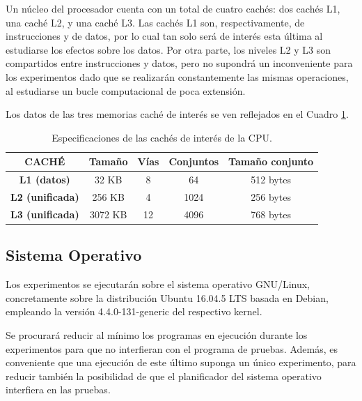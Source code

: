 \documentclass[conference]{IEEEtran}
\begin{document}
Un núcleo del procesador cuenta con un total de cuatro cachés: dos cachés L1, una caché L2, y una caché L3. Las cachés L1 son, respectivamente, de instrucciones y de datos, por lo cual tan solo será de interés esta última al estudiarse los efectos sobre los datos. Por otra parte, los niveles L2 y L3 son compartidos entre instrucciones y datos, pero no supondrá un inconveniente para los experimentos dado que se realizarán constantemente las mismas operaciones, al estudiarse un bucle computacional de poca extensión.

Los datos de las tres memorias caché de interés se ven reflejados en el Cuadro \ref{especificacionesCaches}.

\begin{table}[htbp]
\caption{Especificaciones de las cachés de interés de la CPU.}
\begin{center}
\begin{tabular}{|c|c|c|c|c|}
\hline
\rowcolor[HTML]{EFEFEF} 
\textbf{CACHÉ}                                  & \textbf{Tamaño} & \textbf{Vías} & \textbf{Conjuntos} & \textbf{Tamaño conjunto} \\ \hline
\cellcolor[HTML]{EFEFEF}\textbf{L1 (datos)}      & 32 KB           & 8             & 64                 & 512 bytes                \\ \hline
\cellcolor[HTML]{EFEFEF}\textbf{L2 (unificada)} & 256 KB          & 4             & 1024               & 256 bytes                \\ \hline
\cellcolor[HTML]{EFEFEF}\textbf{L3 (unificada)} & 3072 KB         & 12            & 4096               & 768 bytes                \\ \hline
\end{tabular}
\label{especificacionesCaches}
\end{center}
\end{table}

\subsection{Sistema Operativo}

Los experimentos se ejecutarán sobre el sistema operativo GNU/Linux, concretamente sobre la distribución Ubuntu 16.04.5 LTS basada en Debian, empleando la versión 4.4.0-131-generic del respectivo kernel.

Se procurará reducir al mínimo los programas en ejecución durante los experimentos para que no interfieran con el programa de pruebas. Además, es conveniente que una ejecución de este último suponga un único experimento, para reducir también la posibilidad de que el planificador del sistema operativo interfiera en las pruebas.
\end{document}
